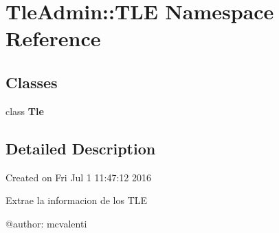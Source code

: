 \section{\-Tle\-Admin\-:\-:\-T\-L\-E \-Namespace \-Reference}
\label{namespace_tle_admin_1_1_t_l_e}
\subsection*{\-Classes}
\begin{DoxyCompactItemize}
\item 
class {\bf \-Tle}
\end{DoxyCompactItemize}


\subsection{\-Detailed \-Description}
\begin{DoxyVerb}
Created on Fri Jul  1 11:47:12 2016

Extrae la informacion de los TLE

@author: mcvalenti
\end{DoxyVerb}
 